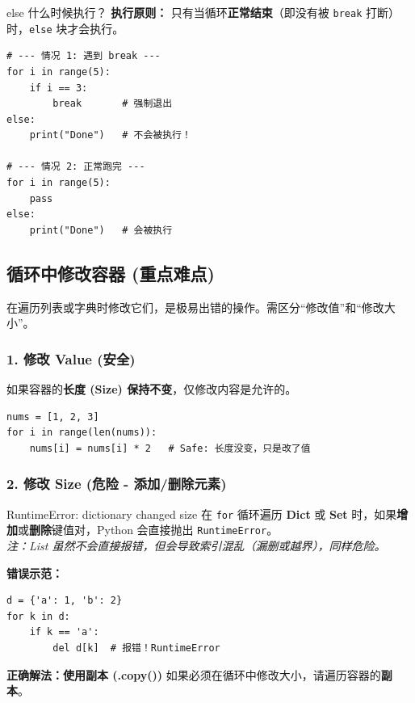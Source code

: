 \documentclass[12pt, a4paper]{article}
\begin{document}
\begin{importantbox}{else 什么时候执行？}
\textbf{执行原则：} 只有当循环\textbf{正常结束}（即没有被 \texttt{break} 打断）时，\texttt{else} 块才会执行。
\end{importantbox}

\begin{lstlisting}[caption={break 与 else 的互斥关系}]
# --- 情况 1: 遇到 break ---
for i in range(5):
    if i == 3:
        break       # 强制退出
else:
    print("Done")   # 不会被执行！

# --- 情况 2: 正常跑完 ---
for i in range(5):
    pass
else:
    print("Done")   # 会被执行
\end{lstlisting}

\subsection{循环中修改容器 (重点难点)}

在遍历列表或字典时修改它们，是极易出错的操作。需区分“修改值”和“修改大小”。

\subsubsection{1. 修改 Value (安全)}
如果容器的\textbf{长度 (Size) 保持不变}，仅修改内容是允许的。
\begin{lstlisting}
nums = [1, 2, 3]
for i in range(len(nums)):
    nums[i] = nums[i] * 2   # Safe: 长度没变，只是改了值
\end{lstlisting}

\subsubsection{2. 修改 Size (危险 - 添加/删除元素)}

\begin{trapbox}{RuntimeError: dictionary changed size}
在 \texttt{for} 循环遍历 \textbf{Dict} 或 \textbf{Set} 时，如果\textbf{增加}或\textbf{删除}键值对，Python 会直接抛出 \texttt{RuntimeError}。
\\ \textit{注：List 虽然不会直接报错，但会导致索引混乱（漏删或越界），同样危险。}
\end{trapbox}

\textbf{错误示范：}
\begin{lstlisting}
d = {'a': 1, 'b': 2}
for k in d:
    if k == 'a':
        del d[k]  # 报错！RuntimeError
\end{lstlisting}

\textbf{正确解法：使用副本 (.copy())}
如果必须在循环中修改大小，请遍历容器的\textbf{副本}。
\end{document}
